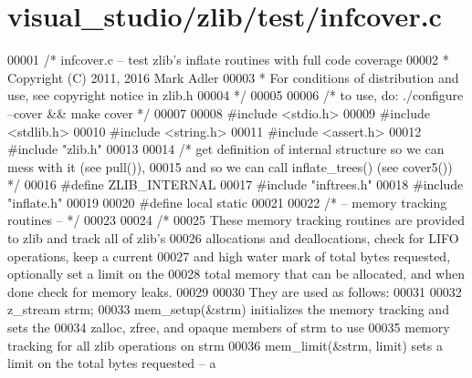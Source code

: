 \hypertarget{visual__studio_2zlib_2test_2infcover_8c_source}{}\section{visual\+\_\+studio/zlib/test/infcover.c}
\label{visual__studio_2zlib_2test_2infcover_8c_source}

\begin{DoxyCode}
00001 \textcolor{comment}{/* infcover.c -- test zlib's inflate routines with full code coverage}
00002 \textcolor{comment}{ * Copyright (C) 2011, 2016 Mark Adler}
00003 \textcolor{comment}{ * For conditions of distribution and use, see copyright notice in zlib.h}
00004 \textcolor{comment}{ */}
00005 
00006 \textcolor{comment}{/* to use, do: ./configure --cover && make cover */}
00007 
00008 \textcolor{preprocessor}{#include <stdio.h>}
00009 \textcolor{preprocessor}{#include <stdlib.h>}
00010 \textcolor{preprocessor}{#include <string.h>}
00011 \textcolor{preprocessor}{#include <assert.h>}
00012 \textcolor{preprocessor}{#include "zlib.h"}
00013 
00014 \textcolor{comment}{/* get definition of internal structure so we can mess with it (see pull()),}
00015 \textcolor{comment}{   and so we can call inflate\_trees() (see cover5()) */}
00016 \textcolor{preprocessor}{#define ZLIB\_INTERNAL}
00017 \textcolor{preprocessor}{#include "inftrees.h"}
00018 \textcolor{preprocessor}{#include "inflate.h"}
00019 
00020 \textcolor{preprocessor}{#define local static}
00021 
00022 \textcolor{comment}{/* -- memory tracking routines -- */}
00023 
00024 \textcolor{comment}{/*}
00025 \textcolor{comment}{   These memory tracking routines are provided to zlib and track all of zlib's}
00026 \textcolor{comment}{   allocations and deallocations, check for LIFO operations, keep a current}
00027 \textcolor{comment}{   and high water mark of total bytes requested, optionally set a limit on the}
00028 \textcolor{comment}{   total memory that can be allocated, and when done check for memory leaks.}
00029 \textcolor{comment}{}
00030 \textcolor{comment}{   They are used as follows:}
00031 \textcolor{comment}{}
00032 \textcolor{comment}{   z\_stream strm;}
00033 \textcolor{comment}{   mem\_setup(&strm)         initializes the memory tracking and sets the}
00034 \textcolor{comment}{                            zalloc, zfree, and opaque members of strm to use}
00035 \textcolor{comment}{                            memory tracking for all zlib operations on strm}
00036 \textcolor{comment}{   mem\_limit(&strm, limit)  sets a limit on the total bytes requested -- a}

\end{DoxyCode}
